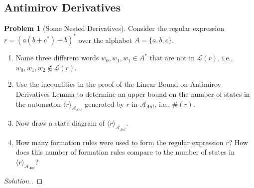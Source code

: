 \documentclass[11pt]{article}
\theoremstyle{theorem} %
\theoremstyle{definition} %
\newtheorem{problem}                    {{\color{BurntOrange}Problem}}
\theoremstyle{remark} %
\begin{document}
\subsection*{Antimirov Derivatives}

\begin{problem}
    [Some Nested Derivatives]
    Consider the regular expression \(r = (a(b+c^*) + b)^*\) over the alphabet \(A = \{a,b,c\}\).
    \begin{enumerate}
        \item Name three different words \(w_0,w_1,w_1 \in A^*\) that are not in \(\mathcal L(r)\), i.e., \(w_0,w_1,w_2 \notin \mathcal L(r)\).
        \item Use the inequalities in the proof of the Linear Bound on Antimirov Derivatives Lemma to determine an upper bound on the number of states in the automaton \(\langle r\rangle_{\mathcal A_{Ant}}\) generated by \(r\) in \(\mathcal A_{Ant}\), i.e., \(\#(r)\).
        \item Now draw a state diagram of \(\langle r\rangle_{\mathcal A_{Ant}}\).
        \item How many formation rules were used to form the regular expression \(r\)? 
            How does this number of formation rules compare to the number of states in \(\langle r\rangle_{\mathcal A_{Ant}}\)?
    \end{enumerate}
\end{problem}

\begin{proof}[Solution.]
    
\end{proof}
\end{document}
